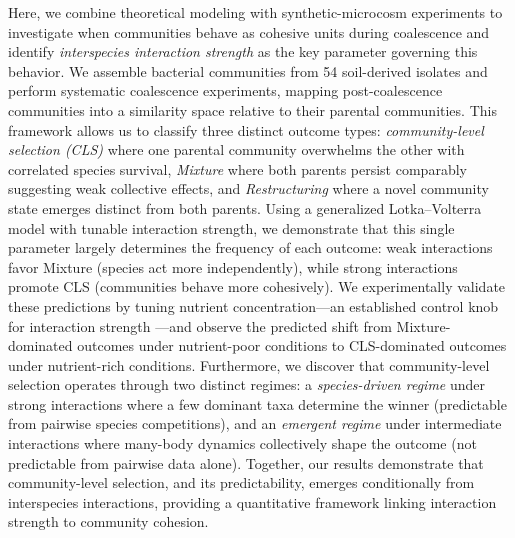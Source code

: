 Here, we combine theoretical modeling with synthetic-microcosm experiments to investigate when communities behave as cohesive units during coalescence and identify \textit{interspecies interaction strength} as the key parameter governing this behavior. We assemble bacterial communities from 54 soil-derived isolates and perform systematic coalescence experiments, mapping post-coalescence communities into a similarity space relative to their parental communities. This framework allows us to classify three distinct outcome types: \textit{community-level selection (CLS)} where one parental community overwhelms the other with correlated species survival, \textit{Mixture} where both parents persist comparably suggesting weak collective effects, and \textit{Restructuring} where a novel community state emerges distinct from both parents. Using a generalized Lotka--Volterra model with tunable interaction strength, we demonstrate that this single parameter largely determines the frequency of each outcome: weak interactions favor Mixture (species act more independently), while strong interactions promote CLS (communities behave more cohesively). We experimentally validate these predictions by tuning nutrient concentration---an established control knob for interaction strength \citep{Ratzke2020}---and observe the predicted shift from Mixture-dominated outcomes under nutrient-poor conditions to CLS-dominated outcomes under nutrient-rich conditions. Furthermore, we discover that community-level selection operates through two distinct regimes: a \textit{species-driven regime} under strong interactions where a few dominant taxa determine the winner (predictable from pairwise species competitions), and an \textit{emergent regime} under intermediate interactions where many-body dynamics collectively shape the outcome (not predictable from pairwise data alone). Together, our results demonstrate that community-level selection, and its predictability, emerges conditionally from interspecies interactions, providing a quantitative framework linking interaction strength to community cohesion.





